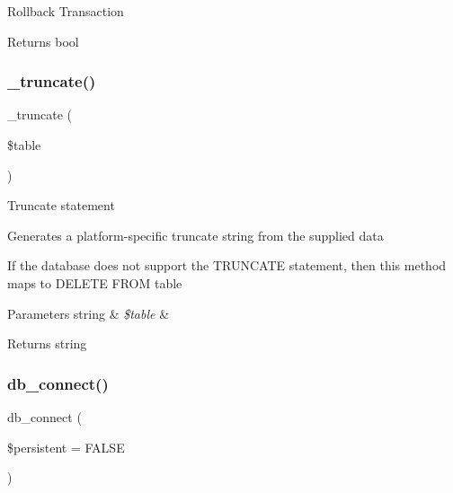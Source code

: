Rollback Transaction

\begin{DoxyReturn}{Returns}
bool 
\end{DoxyReturn}
\mbox{\label{class_c_i___d_b__pdo__mysql__driver_aa029600528fc1ce660a23ff4b4667f95}} 
\subsubsection{\texorpdfstring{\+\_\+truncate()}{\_truncate()}}
{\footnotesize\ttfamily \+\_\+truncate (\begin{DoxyParamCaption}\item[{}]{\$table }\end{DoxyParamCaption})\hspace{0.3cm}{\ttfamily [protected]}}

Truncate statement

Generates a platform-\/specific truncate string from the supplied data

If the database does not support the T\+R\+U\+N\+C\+A\+TE statement, then this method maps to \textquotesingle{}D\+E\+L\+E\+TE F\+R\+OM table\textquotesingle{}


\begin{DoxyParams}[1]{Parameters}
string & {\em \$table} & \\
\hline
\end{DoxyParams}
\begin{DoxyReturn}{Returns}
string 
\end{DoxyReturn}
\mbox{\label{class_c_i___d_b__pdo__mysql__driver_a52bf595e79e96cc0a7c907a9b45aeb4d}} 
\subsubsection{\texorpdfstring{db\+\_\+connect()}{db\_connect()}}
{\footnotesize\ttfamily db\+\_\+connect (\begin{DoxyParamCaption}\item[{}]{\$persistent = {\ttfamily FALSE} }\end{DoxyParamCaption})}

